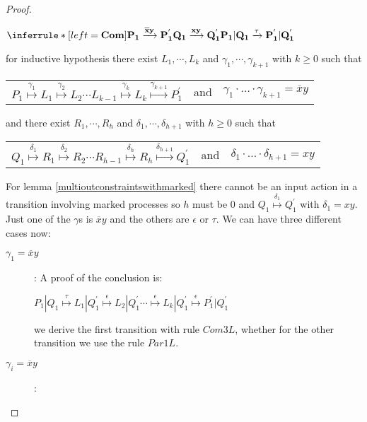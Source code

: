 \begin{proposition}
\begin{proof}
\begin{description}
\begin{center}
	  $\inferrule* [left=\bf{Com}]{
	      P_{1} \xrightarrow{\overline{x}y} P_{1}^{'}
	    \\
	      Q_{1} \xrightarrow{xy} Q_{1}^{'}
	  }{
	    P_{1}|Q_{1} \xrightarrow{\tau} P_{1}^{'}|Q_{1}^{'}
	  }$
	\end{center}
	for inductive hypothesis there exist $L_{1}, \cdots, L_{k}$ and $\gamma_{1}, \cdots, \gamma_{k+1}$ with $k\geq 0$ such that 
	\begin{center}
	  \begin{tabular}{lll}
	    $P_{1} \stackrel{\gamma_{1}}{\longmapsto} L_{1}  \stackrel{\gamma_{2}}{\longmapsto} L_{2} \cdots L_{k-1} \stackrel{\gamma_{k}}{\longmapsto} L_{k} \stackrel{\gamma_{k+1}}{\longmapsto} P_{1}^{'}$ 
	  &
	    and
	  &
	    $\gamma_{1} \cdot \ldots \cdot \gamma_{k+1} = \overline{x}y$
	  \end{tabular}
	\end{center}
	and there exist $R_{1}, \cdots, R_{h}$ and $\delta_{1}, \cdots, \delta_{h+1}$ with $h\geq 0$ such that 
	\begin{center}
	  \begin{tabular}{lll}
	    $Q_{1} \stackrel{\delta_{1}}{\longmapsto} R_{1}  \stackrel{\delta_{2}}{\longmapsto} R_{2} \cdots R_{h-1} \stackrel{\delta_{h}}{\longmapsto} R_{h} \stackrel{\delta_{h+1}}{\longmapsto} Q_{1}^{'}$ 
	  &
	    and
	  &
	    $\delta_{1} \cdot \ldots \cdot \delta_{h+1} = xy$
	  \end{tabular}
	\end{center}
	For lemma \ref{multioutconstraintswithmarked} there cannot be an input action in a transition involving marked processes so $h$ must be $0$ and $Q_{1} \stackrel{\delta_{1}}{\longmapsto} Q_{1}^{'}$ with $\delta_{1}=xy$. Just one of the $\gamma$s is $\overline{x}y$ and the others are $\epsilon$ or $\tau$. We can have three different cases now: 
	\begin{description}
	  \item[$\gamma_{1}=\overline{x}y$]:
	    A proof of the conclusion is:
	    \begin{center}
	      $P_{1}|Q_{1} \stackrel{\tau}{\longmapsto} L_{1}|Q_{1}^{'}
			      \stackrel{\epsilon}{\longmapsto} L_{2}|Q_{1}^{'}
		  \cdots
				\stackrel{\epsilon}{\longmapsto} L_{k}|Q_{1}^{'}
				\stackrel{\epsilon}{\longmapsto} P_{1}^{'}|Q_{1}^{'}$	  
	    \end{center}
	    we derive the first transition with rule $Com3L$, whether for the other transition we use the rule $Par1L$.
	  \item[$\gamma_{i}=\overline{x}y$]:

\end{description}
\end{description}
\end{proof}
\end{proposition}
